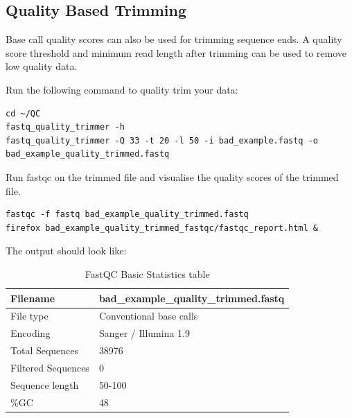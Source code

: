 \subsection{Quality Based Trimming}
Base call quality scores can also be used for trimming sequence ends. A quality
score threshold and minimum read length after trimming can be used to remove low
quality data.

\begin{steps}
Run the following command to quality trim your data:
\begin{lstlisting}
cd ~/QC
fastq_quality_trimmer -h
fastq_quality_trimmer -Q 33 -t 20 -l 50 -i bad_example.fastq -o bad_example_quality_trimmed.fastq
\end{lstlisting}
\end{steps}

\begin{steps}
Run fastqc on the trimmed file and visualise the quality scores of the trimmed
file.

\begin{lstlisting}
fastqc -f fastq bad_example_quality_trimmed.fastq
firefox bad_example_quality_trimmed_fastqc/fastqc_report.html &
\end{lstlisting}

The output should look like:

\begin{table}[H]
  \centering
  \caption{FastQC Basic Statistics table}
    \begin{tabular}{ll}
    \toprule
    Filename & bad\_example\_quality\_trimmed.fastq \\
    \midrule
    File type & Conventional base calls \\
    Encoding & Sanger / Illumina 1.9 \\
    Total Sequences & 38976 \\
    Filtered Sequences & 0 \\
    Sequence length & 50-100 \\
    \%GC  & 48 \\
    \bottomrule
    \end{tabular}%
  \label{tab:badexamplequalitytrimmed}%
\end{table}%


\end{steps}
